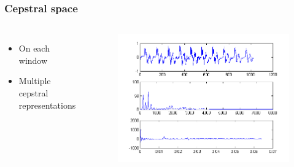 \documentclass[11pt,english]{beamer}
\begin{document}
\begin{frame}
  \frametitle{Cepstral space}
  \begin{columns}
    \begin{itemize}
    \item On each window
    \item Multiple cepstral representations
    \end{itemize}
      \begin{figure}
        \centering
        \includegraphics[scale = 0.5]{cepstre.png}
      \end{figure}
  \end{columns}
\end{frame}
\end{document}
